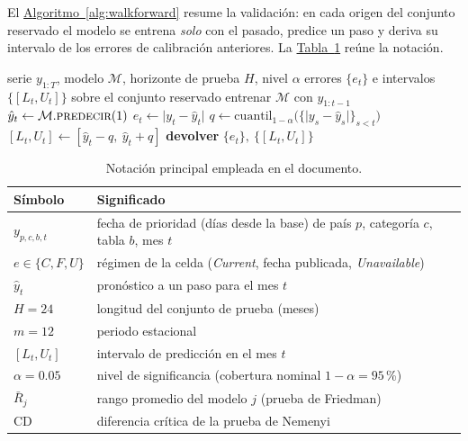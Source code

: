\documentclass[12pt,letterpaper]{report}
\begin{document}
El \hyperref[alg:walkforward]{Algoritmo~\ref*{alg:walkforward}} resume la validación: en cada origen del conjunto reservado
el modelo se entrena \textit{solo} con el pasado, predice un paso y deriva su intervalo de los
errores de calibración anteriores. La \hyperref[tab:notacion]{Tabla~\ref*{tab:notacion}} reúne la notación.

\begin{algorithm}[htbp]
\caption{Validación \textit{walk-forward} sin fuga con intervalo de predicción conforme}
\label{alg:walkforward}
\begin{algorithmic}[1]
\Require serie $y_{1:T}$, modelo $\mathcal{M}$, horizonte de prueba $H$, nivel $\alpha$
\Ensure errores $\{e_t\}$ e intervalos $\{[L_t,U_t]\}$ sobre el conjunto reservado
  \State entrenar $\mathcal{M}$ con $y_{1:t-1}$ 
  \State $\hat{y}_t \gets \mathcal{M}.\textsc{predecir}(1)$
  \State $e_t \gets \lvert y_t - \hat{y}_t\rvert$
  \State $q \gets \mathrm{cuantil}_{1-\alpha}\bigl(\{\lvert y_s-\hat{y}_s\rvert\}_{s<t}\bigr)$ 
  \State $[L_t,U_t] \gets [\hat{y}_t - q,\ \hat{y}_t + q]$
\EndFor
\State \textbf{devolver} $\{e_t\},\ \{[L_t,U_t]\}$
\end{algorithmic}
\end{algorithm}

\begin{table}[htbp]
\centering
\footnotesize
\caption[Notación principal]{Notación principal empleada en el documento.}
\label{tab:notacion}
\begin{tabular}{ll}
\toprule
\rowcolor{uacjblue!15}
\textbf{Símbolo} & \textbf{Significado} \\ \midrule
$y_{p,c,b,t}$ & fecha de prioridad (días desde la base) de país $p$, categoría $c$, tabla $b$, mes $t$ \\
$e \in \{C,F,U\}$ & régimen de la celda (\textit{Current}, fecha publicada, \textit{Unavailable}) \\
$\hat{y}_t$ & pronóstico a un paso para el mes $t$ \\
$H=24$ & longitud del conjunto de prueba (meses) \\
$m=12$ & periodo estacional \\
$[L_t,U_t]$ & intervalo de predicción en el mes $t$ \\
$\alpha=0.05$ & nivel de significancia (cobertura nominal $1-\alpha=95$\,\%) \\
$\bar{R}_j$ & rango promedio del modelo $j$ (prueba de Friedman) \\
$\mathrm{CD}$ & diferencia crítica de la prueba de Nemenyi \\
\bottomrule
\end{tabular}
\end{table}
\end{document}
